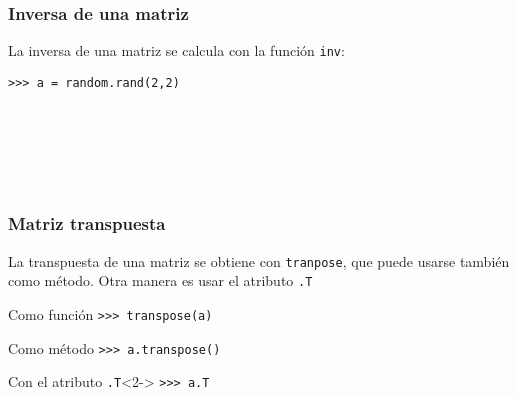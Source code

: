 \begin{frame}[fragile]
\frametitle{Inversa de una matriz}
La inversa de una matriz se calcula con la función \texttt{inv}:
\begin{exampleblock}{}
\fontsize{12}{12}\selectfont
\verb|>>> a = random.rand(2,2)| \\
 \\
\\
 \\
 \\
 \\
\end{exampleblock}
\end{frame}
\begin{frame}[fragile]
\frametitle{Matriz transpuesta}
La transpuesta de una matriz se obtiene con \texttt{tranpose}, que puede usarse también como método. Otra manera es usar el atributo \texttt{.T}
\begin{exampleblock}{Como función}
\verb|>>> transpose(a)| \\
\end{exampleblock}
\end{frame}
\begin{frame}[fragile]
\begin{exampleblock}{Como método}
\verb|>>> a.transpose()| \\
\end{exampleblock}
\begin{exampleblock}{Con el atributo \texttt{.T}}<2->
\verb|>>> a.T| \\
\end{exampleblock}
\end{frame}
